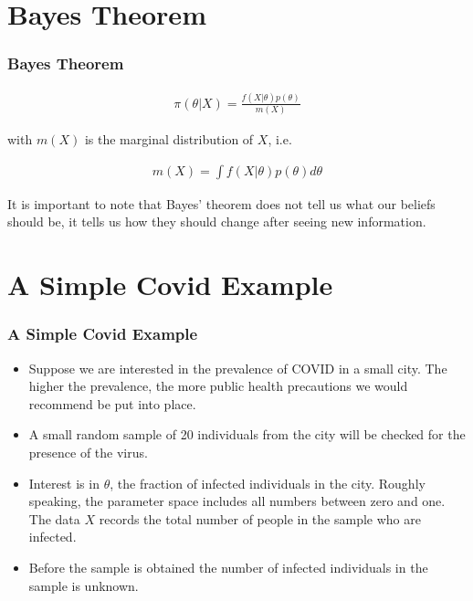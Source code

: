 \documentclass[
  shownotes,
  xcolor={svgnames},
  hyperref={colorlinks,citecolor=DarkBlue,linkcolor=DarkRed,urlcolor=DarkBlue}
  ]{beamer}
\begin{document}
\section{Bayes Theorem}
\begin{frame}[fragile]
\frametitle{Bayes Theorem}


\bigskip
\begin{align}
\pi (\theta|X)=\frac{f(X|\theta)p(\theta)}{m(X)}
\end{align}

\bigskip
with $m(X)$ is the marginal distribution of $X$, i.e.

\begin{align}
m(X)=\int f(X|\theta)p(\theta)d\theta
\end{align}

It is important to note that Bayes' theorem  does not tell us what our beliefs should be, it tells us how they should change after seeing new information.
\end{frame}

\section{A Simple Covid Example}
\begin{frame}[fragile]
\frametitle{A Simple Covid Example}
\begin{itemize}
\item Suppose we are interested in the prevalence of COVID in a small city. The higher the prevalence, the more public health precautions we would recommend be put into place. 
\medskip
\item A small random sample of 20 individuals from the city will be checked for the presence of the virus.
\medskip
\item Interest is in $\theta$, the fraction of infected individuals in the city. Roughly speaking, the parameter space includes all numbers between zero and one. The data $X$ records the total number of people in the sample who are infected.
\medskip
\item Before the sample is obtained the number of infected individuals in the sample is unknown.
\end{itemize}


\end{frame}
\end{document}
